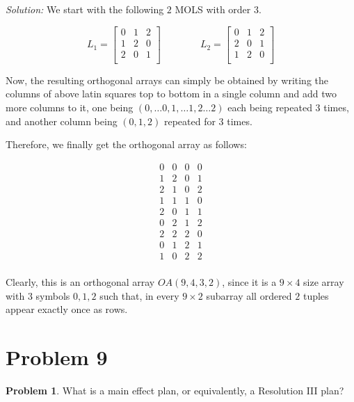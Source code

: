\documentclass[12pt]{article}
\theoremstyle{definition}
\newtheorem*{prb}{Problem}
\newenvironment{problem}{
\begin{tcolorbox}[colback=blue!5!white,colframe=blue!75!black, parbox = true] \begin{prb}  }{\end{prb}\end{tcolorbox} }
\newenvironment{answer}{\textit{Solution: }\quad }{ \hfill \qedsymbol}
\begin{document}
\begin{answer}
	We start with the following $2$ MOLS with order $3$.

	$$L_1 = 
	\begin{bmatrix}
		0 & 1 & 2\\
		1 & 2 & 0\\
		2 & 0 & 1\\
	\end{bmatrix}
	\qquad  \qquad
	L_2 = \begin{bmatrix}
		0 & 1 & 2\\
		2 & 0 & 1\\
		1 & 2 & 0\\
	\end{bmatrix}
	$$

	Now, the resulting orthogonal arrays can simply be obtained by writing the columns of above latin squares top to bottom in a single column and add two more columns to it, one being $(0, \dots 0, 1, \dots 1, 2 \dots 2)$ each being repeated $3$ times, and another column being $(0, 1, 2)$ repeated for $3$ times.

	Therefore, we finally get the orthogonal array as follows:

	$$
	\begin{matrix}
		0 & 0 & 0 & 0 \\
		1 & 2 & 0 & 1 \\
		2 & 1 & 0 & 2 \\
		1 & 1 & 1 & 0 \\
		2 & 0 & 1 & 1 \\
		0 & 2 & 1 & 2 \\
		2 & 2 & 2 & 0 \\
		0 & 1 & 2 & 1 \\
		1 & 0 & 2 & 2 \\
	\end{matrix}
	$$

	Clearly, this is an orthogonal array $OA(9, 4, 3, 2)$, since it is a $9 \times 4$ size array with $3$ symbols $0, 1, 2$ such that, in every $9 \times 2$ subarray all ordered $2$ tuples appear exactly once as rows.

\end{answer}


\section{Problem 9}

\begin{problem}
	What is a main effect plan, or equivalently, a Resolution III plan?
\end{problem}
\end{document}

